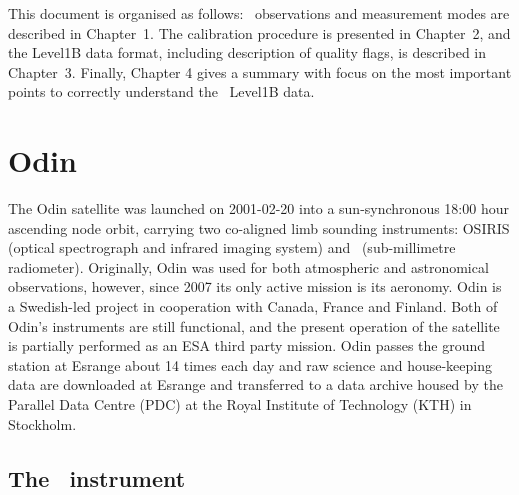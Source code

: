 This document is organised as follows:
\smr\ observations and measurement modes are described 
in Chapter~1. The calibration procedure is presented in
Chapter~2, and the Level1B data format, including description
of quality flags, is described in Chapter~3.
Finally,
Chapter 4 gives a summary with focus on the most important points to correctly
understand the \smr\ Level1B data. 
   

\section{Odin}

The Odin satellite was launched on 2001-02-20 into a sun-synchronous
18:00 hour ascending node orbit, carrying two co-aligned limb sounding
instruments: OSIRIS (optical spectrograph and infrared imaging system) and
\SMR\ (sub-millimetre radiometer). Originally, Odin was used for both
atmospheric and astronomical observations, however, since 2007 its only active
mission is its aeronomy. Odin is a Swedish-led project in cooperation with Canada,
France and Finland. Both of Odin's instruments are still functional, and the
present operation of the satellite is partially performed as an ESA third party
mission.
Odin passes the ground station at Esrange about 14 times each day
and raw science and house-keeping data are downloaded at
Esrange and transferred to a data archive housed by the Parallel
Data Centre (PDC) at the Royal Institute of Technology (KTH)
in Stockholm.


\subsection{The \SMR\ instrument}




